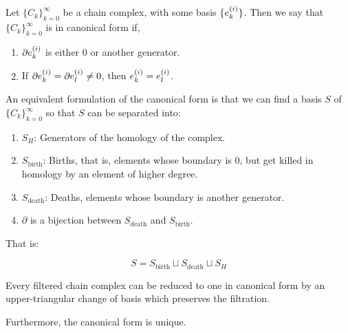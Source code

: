 \begin{definition}

Let $\{C_k\}_{k=0}^{\infty}$ be a chain complex, with some basis $\{e_{k}^{(i)}\}$.
Then we say that $\{C_k\}_{k=0}^{\infty}$ is in canonical form if,

\begin{enumerate}
\item $\partial e_{k}^{(i)}$
is either $0$ or another generator.

\item If $\partial e_{k}^{(i)}=\partial e_{l}^{(i)}\neq 0$,
then $e_{k}^{(i)}= e_{l}^{(i)}$.
\end{enumerate}

\end{definition}

\begin{remark}
\label{canonicalformsplit}
An equivalent formulation of the canonical form is that we can find a basis $S$ 
of $\{C_k\}_{k=0}^{\infty}$ so that $S$
can be separated into: 
\begin{enumerate}
\item $S_H$: Generators of the homology of the complex.

\item $S_{\text{birth}}$: Births, that is, elements whose boundary is $0$, but get killed in homology by an element of higher degree.

\item $S_{\text{death}}$: Deaths, elements whose boundary is another generator. 

\item $\partial$ is a bijection between $S_{\text{death}}$ 
and $S_{\text{birth}}$.
\end{enumerate}

That is:

$$
S=S_{\text{birth}}\sqcup
S_{\text{death}}\sqcup
 S_H
$$ 
\end{remark}

\begin{theorem}
\cite{bar1994}
\label{canonicalform}
Every filtered chain complex can be reduced to 
one in canonical form by an upper-triangular change of basis
which preserves the filtration.

Furthermore, the canonical form is unique.
\end{theorem}

%

%
%
%


